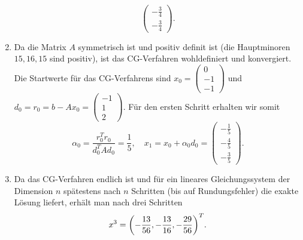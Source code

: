 \documentclass{exercise}
\begin{document}
\begin{enumerate}
\[\begin{pmatrix}
                -\frac{3}{4}\\
                -\frac{3}{4}
            \end{pmatrix}.
        \]
        \item Da die Matrix \(A\) symmetrisch  ist und positiv definit ist (die Hauptminoren \(15, 16, 15\) sind positiv), ist das CG-Verfahren wohldefiniert und konvergiert.
        Die Startwerte für das CG-Verfahrens sind \(x_0 = \begin{pmatrix}
            0\\
            -1\\
            -1
        \end{pmatrix}\) und \(d_0 = r_0 = b - Ax_0 = \begin{pmatrix}
            -1\\
            1\\
            2
        \end{pmatrix}\).
        Für den ersten Schritt erhalten wir somit
        \[
            \alpha_0 = \frac{r_0^T r_0}{d_0^T Ad_0} = \frac{1}{5}, \quad x_1 = x_0 + \alpha_0 d_0 = \begin{pmatrix}
                -\frac{1}{5}\\
                -\frac{4}{5}\\
                -\frac{3}{5}
            \end{pmatrix}.
        \]
        \item Da das CG-Verfahren endlich ist und für ein lineares Gleichungssystem der Dimension \(n\) spätestens nach \(n\) Schritten (bis auf Rundungsfehler) die exakte Lösung liefert, erhält man nach drei Schritten
        \[
            x^3 = \parentheses*{-\frac{13}{56}, -\frac{13}{16}, -\frac{29}{56}}^T.
        \]
    \end{enumerate}
\end{document}
